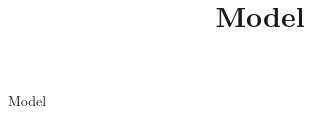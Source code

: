 \documentclass{article}
\title{Model}
\begin{document}
\begin{center}
    {\huge{Model}}
\end{center}    
    \begin{multicols}{2}
    
    \end{multicols}
\end{document}
